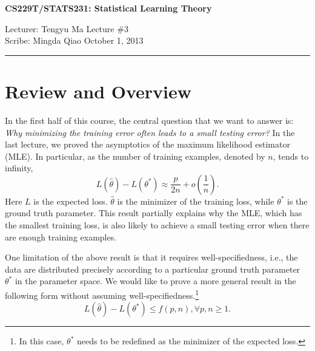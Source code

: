\documentclass[11pt]{article}
\newcommand{\draftnotice}{\vbox to 0.25in{\noindent
   \raisebox{0.6in}[0in][0in]{\makebox[\textwidth][r]{\it
    DRAFT --- a final version will be posted shortly}}}
   \vspace{-.25in}\vspace{-\baselineskip}
}
\begin{document}
\thispagestyle{empty}


\begin{center}
\bf\large CS229T/STATS231: Statistical Learning Theory
\end{center}

\noindent
Lecturer: Tengyu Ma   %
\hfill
Lecture \#3               %
\\
Scribe: Mingda Qiao                 %
\hfill
October 1, 2013           %

\noindent
\rule{\textwidth}{1pt}

\medskip


\newcommand{\A}{\mathcal{A}}
\newcommand{\argmin}{\operatorname*{argmin}}
\newcommand{\Ex}[2]{\mathbb{E}_{#1}\left[#2\right]}
\renewcommand{\H}{\mathcal{H}}
\newcommand{\poly}{\mathrm{poly}}
\newcommand{\pr}[2]{\Pr_{#1}\left[#2\right]}
\newcommand{\real}{\mathbb{R}}
\newcommand{\size}{\mathrm{size}}
\newcommand{\X}{\mathcal{X}}
\newcommand{\Y}{\mathcal{Y}}

\newtheorem{theorem}{Theorem}
\newtheorem{lemma}[theorem]{Lemma}
\newtheorem{definition}[theorem]{Definition}
\newtheorem{remark}[theorem]{Remark}

\section{Review and Overview}

In the first half of this course, the central question that we want to answer is: \emph{Why minimizing the training error often leads to a small testing error?} In the last lecture, we proved the asymptotics of the maximum likelihood estimator (MLE). In particular, as the number of training examples, denoted by $n$, tends to infinity,
	\[L(\hat\theta) - L(\theta^*) \approx \frac{p}{2n} + o\left(\frac{1}{n}\right).\]
Here $L$ is the expected loss. $\hat \theta$ is the minimizer of the training loss, while $\theta^*$ is the ground truth parameter. This result partially explains why the MLE, which has the smallest training loss, is also likely to achieve a small testing error when there are enough training examples.

One limitation of the above result is that it requires well-specifiedness, i.e., the data are distributed precisely according to a particular ground truth parameter $\theta^*$ in the parameter space. We would like to prove a more general result in the following form without assuming well-specifiedness.\footnote{In this case, $\theta^*$ needs to be redefined as the minimizer of the expected loss.}
	\[L(\hat\theta) - L(\theta^*) \le f(p, n), \forall p, n \ge 1.\]
\end{document}
